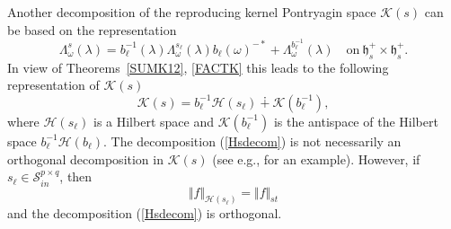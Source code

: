 \documentclass[12pt,twoside,a4paper]{amsart}
\theoremstyle{definition}
\numberwithin{equation}{section}
\begin{document}
Another decomposition of the reproducing kernel Pontryagin space
${{\mathcal K}}(s)$ can
be based on the
representation
\begin{equation}\label{Lambdecom}
    {\mathsf { \Lambda}}_\omega^s(\lambda)=b_{\ell}^{-1}({\lambda}){\mathsf
    \Lambda}_\omega^{s_{\ell}}(\lambda)b_{\ell}({\omega})^{-*}+{\mathsf
    \Lambda}_\omega^{b_{\ell}^{-1}}(\lambda)
    \quad\text{on}\ \mathfrak{h}_s^+\times\mathfrak{h}_s^+.
\end{equation}
In view of Theorems~\ref{SUMK12}, \ref{FACTK} this leads to the
following representation of ${{\mathcal K}}(s)$ 
\begin{equation}\label{Hsdecom}
    {{\mathcal K}}(s)=b_{\ell}^{-1}{{\mathcal H}}(s_{\ell})\dotplus{{\mathcal K}}(b_{\ell}^{-1}),
\end{equation}
where ${{\mathcal H}}(s_{\ell})$ is a Hilbert space and ${{\mathcal K}}(b_{\ell}^{-1})$ is
the antispace of  the Hilbert space $b_{\ell}^{-1}{{\mathcal H}}(b_{\ell})$.
The decomposition (\ref{Hsdecom}) is not necessarily an orthogonal
decomposition in ${{\mathcal K}}(s)$ (see e.g., \cite[p.148]{ADRS} for an
example). However, if $s_{\ell}\in{{\mathcal S}}_{in}^{p\times q}$, then
$$
\Vert f\Vert_{{{\mathcal H}}(s_\ell)}=\Vert f\Vert_{st}
$$
and the decomposition (\ref{Hsdecom}) is orthogonal.
\end{document}
